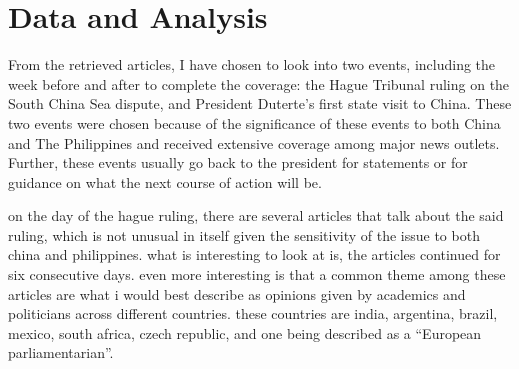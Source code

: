 \section{Data and Analysis}\label{sec:data}

From the retrieved articles, I have chosen to look into two events,
including the week before and after to complete the coverage: the Hague
Tribunal ruling on the South China Sea dispute, and President Duterte's
first state visit to China. These two events were chosen because of the
significance of these events to both China and The Philippines and
received extensive coverage among major news outlets. Further, these
events usually go back to the president for statements or for guidance
on what the next course of action will be.

on the day of the hague ruling, there are several articles that talk
about the said ruling, which is not unusual in itself given the
sensitivity of the issue to both china and philippines. what is
interesting to look at is, the articles continued for six consecutive
days. even more interesting is that a common theme among these articles
are what i would best describe as opinions given by academics and
politicians across different countries. these countries are india,
argentina, brazil, mexico, south africa, czech republic, and
one being described as a ``European parliamentarian''.


